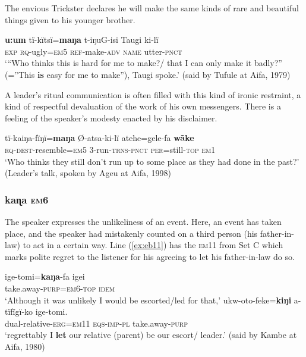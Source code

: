 \documentclass[output=paper]{langsci/langscibook}
\begin{document}
The envious Trickster declares he will make the same kinds of rare and beautiful things given to his younger brother.


\begin{exe}
	\ex \label{ex:eb8}
	\gll \textbf{u:um} tï-kïtsï=\textbf{maŋa} t-iŋuG-isi Taugi ki-lï\\
	\textsc{exp} \textsc{rq}-ugly=\textsc{em5} \textsc{ref}-make-\textsc{adv} \textsc{name} utter-\textsc{pnct}\\
	\trans `“Who thinks this is hard for me to make?/ that I can only make it badly?” (=”This \textbf{is} easy for me to make”), Taugi spoke.’ (said by Tufule at Aifa, 1979)
\end{exe}

A leader’s ritual communication is often filled with this kind of ironic restraint, a kind of respectful devaluation of the work of his own messengers.  There is a feeling of the speaker’s modesty enacted by his disclaimer. 


\begin{exe}
	\ex \label{ex:eb9}
	\gll tï-kaiŋa-fïŋï=\textbf{maŋa} Ø-atsa-ki-lï atehe=gele-fa \textbf{wãke}\\
	\textsc{rq-dest}-resemble=\textsc{em5} 3-run-\textsc{trns-pnct} \textsc{per}=still-\textsc{top} \textsc{em1}\\
	\trans ‘Who thinks they still don’t run up to some place as they had done in the past?' (Leader’s talk, spoken by Ageu at Aifa, 1998)
\end{exe}

\subsubsection{kaɳa \textsc{em}6} 
The speaker expresses the unlikeliness of an event. 
Here, an event has taken place,  and the speaker had mistakenly counted on a third person (his father-in-law)  to act in a certain way. Line (\ref{ex:eb11}) has the \textsc{em}11 from Set C which marks polite regret to the listener for his agreeing to let his father-in-law do so.

\begin{exe}
	\ex
	\begin{xlist}
	\ex \label{ex:eb10}
	\gll ige-tomi=\textbf{kaŋa}-fa igei\\
	take.away-\textsc{purp=em6-top} \textsc{idem}\\
	\trans ‘Although it was unlikely  I would be escorted/led for that,’
	\ex \label{ex:eb11}
	\gll ukw-oto-feke=\textbf{kiŋi} a-tïfïgï-ko ige-tomi.\\
	dual-relative-\textsc{erg=em11} \textsc{eqs-imp-pl} take.away-\textsc{purp}\\
	\trans ‘regrettably  I \textbf{let} our relative (parent) be our escort/ leader.’ (said by Kambe at Aifa, 1980)
	\end{xlist}
\end{exe}
\end{document}
